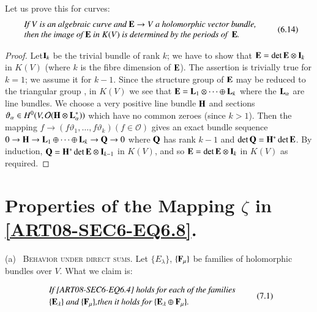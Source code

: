 Let us prove this for curves:
\begin{equation*}
\begin{array}{l}
\text{\em If $V$ is an algebraic curve and $\mathbf{E}\to V$ a holomorphic vector bundle,}\\
\text{\em then the image of $\mathbf{E}$ in $K(V)$ is determined by the periods of~ $\mathbf{E}$.}
\end{array}\tag{6.14}\label{art08-sec6-eq6.14}
\end{equation*}

\begin{proof}
Let\pageoriginale $\mathbf{I}_{k}$ be the trivial bundle of rank $k$; we have to show that $\mathbf{E}=\det \mathbf{E}\otimes \mathbf{I}_{k}$ in $K(V)$ (where $k$ is the fibre dimension of $\mathbf{E}$). The assertion is trivially true for $k=1$; we assume it for $k-1$. Since the structure group of $\mathbf{E}$ may be reduced to the triangular group \cite{art08-key2}, in $K(V)$ we see that $\mathbf{E}=\mathbf{L}_{1}\otimes\cdots\oplus \mathbf{L}_{k}$ where the $\mathbf{L}_{\alpha}$ are line bundles. We choose a very positive line bundle $\mathbf{H}$ and sections $\vartheta_{\alpha}\in H^{0}(V,\mathcal{O}(\mathbf{H}\otimes \mathbf{L}^{*}_{\alpha}))$ which have no common zeroes (since $k>1$). Then the mapping $f\to (f\vartheta_{1},\ldots,f\vartheta_{k})(f\in \mathcal{O})$ gives an exact bundle sequence $0\to \mathbf{H}\to \mathbf{L}_{1}\oplus\cdots\oplus \mathbf{L}_{k}\to \mathbf{Q}\to 0$ where $\mathbf{Q}$ has rank $k-1$ and $\det \mathbf{Q}=\mathbf{H}^{*}\det \mathbf{E}$. By induction, $\mathbf{Q}=\mathbf{H}^{*}\det \mathbf{E}\otimes \mathbf{I}_{k-1}$ in $K(V)$, and so $\mathbf{E}=\det \mathbf{E}\otimes \mathbf{I}_{k}$ in $K(V)$ as required.
\end{proof}

\section{Properties of the Mapping \texorpdfstring{$\zeta$}{zeta} in \texorpdfstring{\eqref{ART08-SEC6-EQ6.8}}{eq6.8}.}\label{art08-sec7}

(a)~ \textsc{Behavior under direct sums.} Let $\{E_{\lambda}\}$, $\{\mathbf{F}_{\mu}\}$ be families of holomorphic bundles over $V$. What we claim is:

\vfill\eject

\begin{equation*}
\begin{array}{l}
\text{\em If \eqref{ART08-SEC6-EQ6.4} holds for each of the families}\\[2pt]
\text{\em $\{\mathbf{E}_{\lambda}\}$ and $\{\mathbf{F}_{\mu}\}$,then it holds for $\{\mathbf{E}_{\lambda}\oplus \mathbf{F}_{\mu}\}$.}
\end{array}\tag{7.1}\label{art08-sec7-eq7.1}
\end{equation*}

